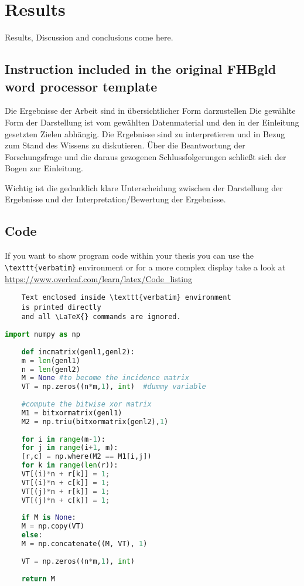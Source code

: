 \chapter{Results}

Results, Discussion and conclusions come here.

\section{Instruction included in the original FHBgld word processor template}
Die Ergebnisse der Arbeit sind in übersichtlicher Form darzustellen Die gewählte Form der Darstellung ist vom gewählten Datenmaterial und den in der Einleitung gesetzten Zielen abhängig. Die Ergebnisse sind zu interpretieren und in Bezug zum Stand des Wissens zu diskutieren. Über die Beantwortung der Forschungsfrage und die daraus gezogenen Schlussfolgerungen schließt sich der Bogen zur Einleitung. 

Wichtig ist die gedanklich klare Unterscheidung zwischen der Darstellung der Ergebnisse und der Interpretation/Bewertung der Ergebnisse. 

\section{Code}
If you want to show program code within your thesis you can use the \verb|\texttt{verbatim}| environment or for a more complex display take a look at \url{https://www.overleaf.com/learn/latex/Code_listing}

\begin{verbatim}
	Text enclosed inside \texttt{verbatim} environment 
	is printed directly 
	and all \LaTeX{} commands are ignored.
\end{verbatim}

\begin{lstlisting}[language=Python, caption=Python example]
	import numpy as np
	
	def incmatrix(genl1,genl2):
	m = len(genl1)
	n = len(genl2)
	M = None #to become the incidence matrix
	VT = np.zeros((n*m,1), int)  #dummy variable
	
	#compute the bitwise xor matrix
	M1 = bitxormatrix(genl1)
	M2 = np.triu(bitxormatrix(genl2),1) 
	
	for i in range(m-1):
	for j in range(i+1, m):
	[r,c] = np.where(M2 == M1[i,j])
	for k in range(len(r)):
	VT[(i)*n + r[k]] = 1;
	VT[(i)*n + c[k]] = 1;
	VT[(j)*n + r[k]] = 1;
	VT[(j)*n + c[k]] = 1;
	
	if M is None:
	M = np.copy(VT)
	else:
	M = np.concatenate((M, VT), 1)
	
	VT = np.zeros((n*m,1), int)
	
	return M
\end{lstlisting}
